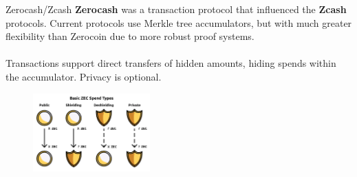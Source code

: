 \documentclass[aspectratio=169]{beamer}
\begin{document}
\begin{frame}{Zerocash/Zcash}
\textbf{Zerocash} was a transaction protocol that influenced the \textbf{Zcash} protocols. Current protocols use Merkle tree accumulators, but with much greater flexibility than Zerocoin due to more robust proof systems. \\~\\

Transactions support direct transfers of hidden amounts, hiding spends within the accumulator. Privacy is optional.

\begin{figure}
\includegraphics[width=0.4\textwidth]{zcash-types.png}
\end{figure}
\end{frame}
\end{document}
